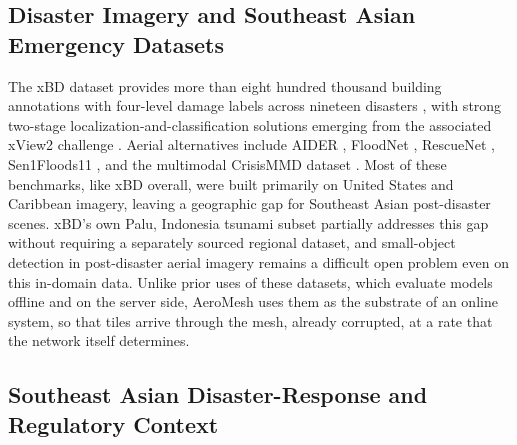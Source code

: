 \documentclass[drones,article,submit,moreauthors]{Definitions/mdpi}
\begin{document}
\subsection{Disaster Imagery and Southeast Asian Emergency Datasets}

The xBD dataset provides more than eight hundred thousand building annotations with four-level damage labels across nineteen disasters \cite{gupta2019xbd}, with strong two-stage localization-and-classification solutions emerging from the associated xView2 challenge \cite{weber2020building,khattak2024deepdamagenet,gerard2024simple}. Aerial alternatives include AIDER \cite{kyrkou2020emergencynet}, FloodNet \cite{rahnemoonfar2021floodnet}, RescueNet \cite{rahnemoonfar2023rescuenet}, Sen1Floods11 \cite{bonafilia2020sen1floods11}, and the multimodal CrisisMMD dataset \cite{alam2018crisismmd}. Most of these benchmarks, like xBD overall, were built primarily on United States and Caribbean imagery, leaving a geographic gap for Southeast Asian post-disaster scenes. xBD's own Palu, Indonesia tsunami subset partially addresses this gap without requiring a separately sourced regional dataset, and small-object detection in post-disaster aerial imagery remains a difficult open problem even on this in-domain data. Unlike prior uses of these datasets, which evaluate models offline and on the server side, AeroMesh uses them as the substrate of an online system, so that tiles arrive through the mesh, already corrupted, at a rate that the network itself determines.

\subsection{Southeast Asian Disaster-Response and Regulatory Context}
\end{document}
